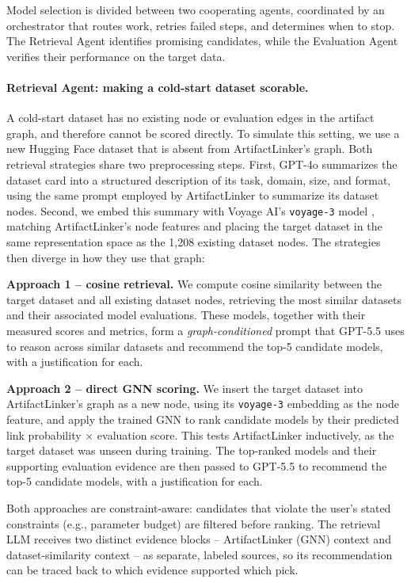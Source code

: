 Model selection is divided between two cooperating agents, coordinated by an orchestrator that routes work, retries failed steps, and determines when to stop. The Retrieval Agent identifies promising candidates, while the Evaluation Agent verifies their performance on the target data.

\paragraph{Retrieval Agent: making a cold-start dataset scorable.}
A cold-start dataset has no existing node or evaluation edges in the artifact graph, and therefore cannot be scored directly. To simulate this setting, we use a new Hugging Face dataset that is absent from ArtifactLinker's graph. Both retrieval strategies share two preprocessing steps. First, GPT-4o \citep{openai2024gpt4o} summarizes the dataset card into a structured description of its task, domain, size, and format, using the same prompt employed by ArtifactLinker to summarize its dataset nodes. Second, we embed this summary with Voyage AI's \texttt{voyage-3} model \citep{voyageai2024voyage3}, matching ArtifactLinker's node features and placing the target dataset in the same representation space as the 1{,}208 existing dataset nodes.
The strategies then diverge in how they use that graph:

\textbf{Approach 1 -- cosine retrieval.} We compute cosine similarity between the target dataset and all existing dataset nodes, retrieving the most similar datasets and their associated model evaluations. These models, together with their measured scores and metrics, form a \emph{graph-conditioned} prompt that GPT-5.5 \citep{openai2026gpt55} uses to reason across similar datasets and recommend the top-5 candidate models, with a justification for each.

\textbf{Approach 2 -- direct GNN scoring.} We insert the target dataset into ArtifactLinker's graph as a new node, using its \texttt{voyage-3} embedding as the node feature, and apply the trained GNN to rank candidate models by their predicted link probability $\times$ evaluation score. This tests ArtifactLinker inductively, as the target dataset was unseen during training. The top-ranked models and their supporting evaluation evidence are then passed to GPT-5.5 \citep{openai2026gpt55} to recommend the top-5 candidate models, with a justification for each.

Both approaches are constraint-aware: candidates that violate the user's stated constraints (e.g., parameter budget) are filtered before ranking. The retrieval LLM receives two distinct evidence blocks -- ArtifactLinker (GNN) context and dataset-similarity context -- as separate, labeled sources, so its recommendation can be traced back to which evidence supported which pick.

